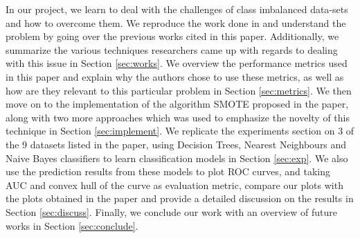 \documentclass[10pt,journal,compsoc]{IEEEtran}
\begin{document}
In our project, we learn to deal with the challenges of class imbalanced data-sets and how to overcome them. We reproduce the work done in \cite{smote} and understand the problem by going over the previous works cited in this paper. Additionally, we summarize the various techniques researchers came up with regards to dealing with this issue in Section \ref{sec:works}. We overview the performance metrics used in this paper and explain why the authors chose to use these metrics, as well as how are they relevant to this particular problem in Section \ref{sec:metrics}. We then move on to the implementation of the algorithm SMOTE\cite{smote} proposed in the paper, along with two more approaches which was used to emphasize the novelty of this technique in Section \ref{sec:implement}. We replicate the experiments section on 3 of the 9 datasets listed in the paper, using Decision Trees, Nearest Neighbours and Naive Bayes classifiers to learn classification models in Section \ref{sec:exp}. We also use the prediction results from these models to plot ROC curves, and taking AUC and convex hull of the curve as evaluation metric, compare our plots with the plots obtained in the paper and provide a detailed discussion on the results in Section \ref{sec:discuss}. Finally, we conclude our work with an overview of future works in Section \ref{sec:conclude}. 





%
%
\end{document}
